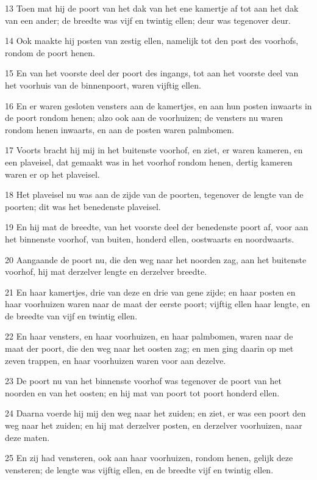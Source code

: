 \par 13 Toen mat hij de poort van het dak van het ene kamertje af tot aan het dak van een ander; de breedte was vijf en twintig ellen; deur was tegenover deur.
\par 14 Ook maakte hij posten van zestig ellen, namelijk tot den post des voorhofs, rondom de poort henen.
\par 15 En van het voorste deel der poort des ingangs, tot aan het voorste deel van het voorhuis van de binnenpoort, waren vijftig ellen.
\par 16 En er waren gesloten vensters aan de kamertjes, en aan hun posten inwaarts in de poort rondom henen; alzo ook aan de voorhuizen; de vensters nu waren rondom henen inwaarts, en aan de posten waren palmbomen.
\par 17 Voorts bracht hij mij in het buitenste voorhof, en ziet, er waren kameren, en een plaveisel, dat gemaakt was in het voorhof rondom henen, dertig kameren waren er op het plaveisel.
\par 18 Het plaveisel nu was aan de zijde van de poorten, tegenover de lengte van de poorten; dit was het benedenste plaveisel.
\par 19 En hij mat de breedte, van het voorste deel der benedenste poort af, voor aan het binnenste voorhof, van buiten, honderd ellen, oostwaarts en noordwaarts.
\par 20 Aangaande de poort nu, die den weg naar het noorden zag, aan het buitenste voorhof, hij mat derzelver lengte en derzelver breedte.
\par 21 En haar kamertjes, drie van deze en drie van gene zijde; en haar posten en haar voorhuizen waren naar de maat der eerste poort; vijftig ellen haar lengte, en de breedte van vijf en twintig ellen.
\par 22 En haar vensters, en haar voorhuizen, en haar palmbomen, waren naar de maat der poort, die den weg naar het oosten zag; en men ging daarin op met zeven trappen, en haar voorhuizen waren voor aan dezelve.
\par 23 De poort nu van het binnenste voorhof was tegenover de poort van het noorden en van het oosten; en hij mat van poort tot poort honderd ellen.
\par 24 Daarna voerde hij mij den weg naar het zuiden; en ziet, er was een poort den weg naar het zuiden; en hij mat derzelver posten, en derzelver voorhuizen, naar deze maten.
\par 25 En zij had vensteren, ook aan haar voorhuizen, rondom henen, gelijk deze vensteren; de lengte was vijftig ellen, en de breedte vijf en twintig ellen.
